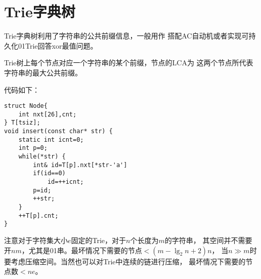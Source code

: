 \section{Trie字典树}
Trie字典树利用了字符串的公共前缀信息，一般用作
搭配AC自动机或者实现可持久化01Trie回答xor最值问题。

Trie树上每个节点对应一个字符串的某个前缀，节点的LCA为
这两个节点所代表字符串的最大公共前缀。

代码如下：
\begin{lstlisting}
struct Node{
    int nxt[26],cnt;
} T[tsiz];
void insert(const char* str) {
    static int icnt=0;
    int p=0;
    while(*str) {
        int& id=T[p].nxt[*str-'a']
        if(id==0)
            id=++icnt;
        p=id;
        ++str;
    }
    ++T[p].cnt;
}
\end{lstlisting}

注意对于字符集大小$e$固定的Trie，对于$n$个长度为$m$的字符串，
其空间并不需要开$nm$，尤其是01串。最坏情况下需要的节点$<(m-\lg_2 n+2)n$，
当$n\gg m$时要考虑压缩空间。当然也可以对Trie中连续的链进行压缩，
最坏情况下需要的节点数$<ne$。
